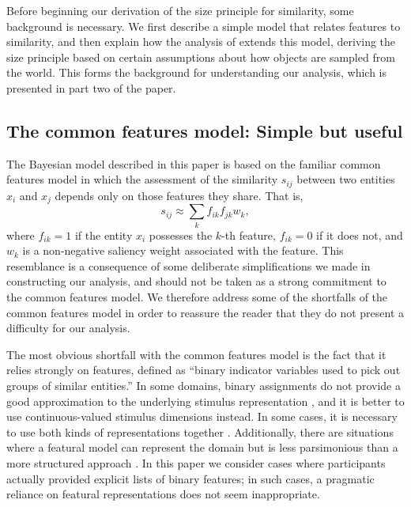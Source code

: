 \documentclass{apa}
\begin{document}
Before beginning our derivation of the size principle for similarity, some background is necessary. We first describe a simple model that relates features to similarity, and then explain how the analysis of  extends this model, deriving the size principle based on certain assumptions about how objects are sampled from the world. This forms the background for understanding our analysis, which is presented in part two of the paper.

\subsection{The common features model: Simple but useful}


The Bayesian model described in this paper is based on the familiar common features model \cite{Tversky1977,Shepard1979} in which the assessment of the similarity $s_{ij}$ between two entities $x_i$ and $x_j$ depends only on those features they share. That is,
\begin{equation}
s_{ij} \approx \sum_k f_{ik} f_{jk} w_k,
\label{cf}
\end{equation}
\noindent
where $f_{ik}=1$ if the entity $x_i$ possesses the $k$-th feature, $f_{ik}=0$ if it does not, and $w_k$ is a non-negative saliency weight associated with the feature. This resemblance is a consequence of some deliberate simplifications we made in constructing our analysis, and should not be taken as a strong commitment to the common features model. We therefore address some of the shortfalls of the common features model in order to reassure the reader that they do not present a difficulty for our analysis.

The most obvious shortfall with the common features model is the fact that it relies strongly on  features, defined as ``binary indicator variables used to pick out groups of similar entities.'' In some domains, binary assignments do not provide a good approximation to the underlying stimulus representation \cite{Tversky1986}, and it is better to use continuous-valued stimulus dimensions instead. In some cases, it is necessary to use both kinds of representations together \cite{Navarro2003}. Additionally, there are situations where a featural model can represent the domain but is less parsimonious than a more structured approach \cite{Goldstone1994}. In this paper we consider cases where participants actually provided explicit lists of binary features; in such cases, a pragmatic reliance on featural representations does not seem inappropriate.
\end{document}
